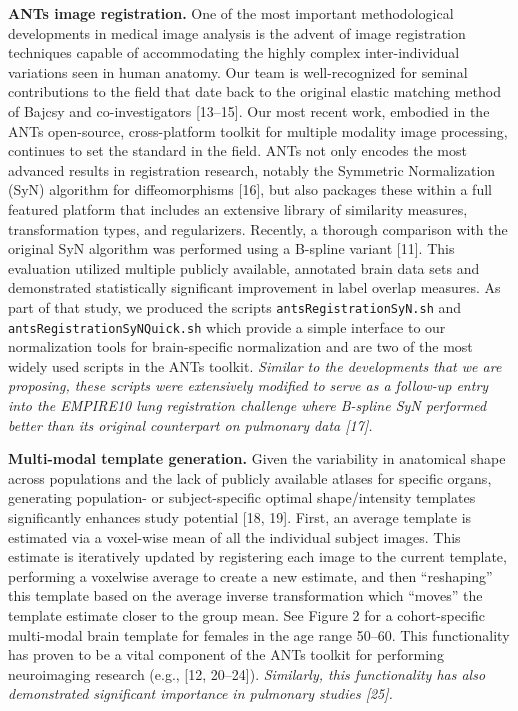 \documentclass[11pt,]{article}
\begin{document}
\textbf{ANTs image registration.} One of the most important
methodological developments in medical image analysis is the advent of
image registration techniques capable of accommodating the highly
complex inter-individual variations seen in human anatomy. Our team is
well-recognized for seminal contributions to the field that date back to
the original elastic matching method of Bajcsy and co-investigators
{[}13--15{]}. Our most recent work, embodied in the ANTs open-source,
cross-platform toolkit for multiple modality image processing, continues
to set the standard in the field. ANTs not only encodes the most
advanced results in registration research, notably the Symmetric
Normalization (SyN) algorithm for diffeomorphisms {[}16{]}, but also
packages these within a full featured platform that includes an
extensive library of similarity measures, transformation types, and
regularizers. Recently, a thorough comparison with the original SyN
algorithm was performed using a B-spline variant {[}11{]}. This
evaluation utilized multiple publicly available, annotated brain data
sets and demonstrated statistically significant improvement in label
overlap measures. As part of that study, we produced the scripts
\texttt{antsRegistrationSyN.sh} and \texttt{antsRegistrationSyNQuick.sh}
which provide a simple interface to our normalization tools for
brain-specific normalization and are two of the most widely used scripts
in the ANTs toolkit. \emph{Similar to the developments that we are
proposing, these scripts were extensively modified to serve as a
follow-up entry into the EMPIRE10 lung registration challenge where
B-spline SyN performed better than its original counterpart on pulmonary
data {[}17{]}.}

\textbf{Multi-modal template generation.} Given the variability in
anatomical shape across populations and the lack of publicly available
atlases for specific organs, generating population- or subject-specific
optimal shape/intensity templates significantly enhances study potential
{[}18, 19{]}. First, an average template is estimated via a voxel-wise
mean of all the individual subject images. This estimate is iteratively
updated by registering each image to the current template, performing a
voxelwise average to create a new estimate, and then ``reshaping'' this
template based on the average inverse transformation which ``moves'' the
template estimate closer to the group mean. See Figure 2 for a
cohort-specific multi-modal brain template for females in the age range
50--60. This functionality has proven to be a vital component of the
ANTs toolkit for performing neuroimaging research (e.g., {[}12,
20--24{]}). \emph{Similarly, this functionality has also demonstrated
significant importance in pulmonary studies {[}25{]}.}
\end{document}
